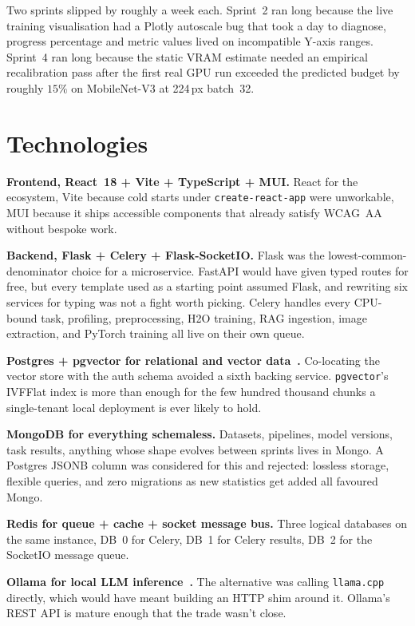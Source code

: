 \documentclass[12pt, a4paper, oneside]{report}
\begin{document}
Two sprints slipped by roughly a week each. Sprint~2 ran long because
the live training visualisation had a Plotly autoscale bug that took
a day to diagnose, progress percentage and metric values lived on
incompatible Y-axis ranges. Sprint~4 ran long because the static VRAM
estimate needed an empirical recalibration pass after the first real
GPU run exceeded the predicted budget by roughly $15\%$ on
MobileNet-V3 at 224\,px batch~32.

\section{Technologies}

\textbf{Frontend, React~18 + Vite + TypeScript + MUI.} React for
the ecosystem, Vite because cold starts under
\texttt{create-react-app} were unworkable, MUI because it ships
accessible components that already satisfy WCAG~AA without bespoke
work.

\textbf{Backend, Flask + Celery + Flask-SocketIO.} Flask was the
lowest-common-denominator choice for a microservice. FastAPI would
have given typed routes for free, but every template used as a
starting point assumed Flask, and rewriting six services for typing
was not a fight worth picking. Celery handles every CPU-bound task, profiling, preprocessing, H2O training, RAG ingestion, image
extraction, and PyTorch training all live on their own queue.

\textbf{Postgres + pgvector for relational and vector data~\cite{pgvector}.}
Co-locating the vector store with the auth schema avoided a sixth
backing service. \texttt{pgvector}'s IVFFlat index is more than
enough for the few hundred thousand chunks a single-tenant local
deployment is ever likely to hold.

\textbf{MongoDB for everything schemaless.} Datasets, pipelines,
model versions, task results, anything whose shape evolves
between sprints lives in Mongo. A Postgres JSONB column was
considered for this and rejected: lossless storage, flexible queries,
and zero migrations as new statistics get added all favoured Mongo.

\textbf{Redis for queue + cache + socket message bus.} Three logical
databases on the same instance, DB~0 for Celery, DB~1 for Celery
results, DB~2 for the SocketIO message queue.

\textbf{Ollama for local LLM inference~\cite{ollama}.} The alternative was calling
\texttt{llama.cpp} directly, which would have meant building an HTTP
shim around it. Ollama's REST API is mature enough that the trade
wasn't close.
\end{document}
